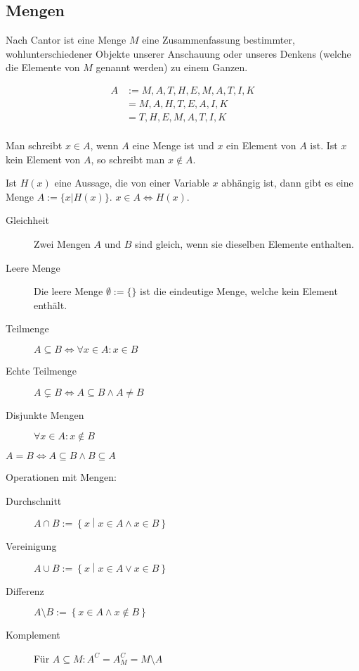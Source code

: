 \subsection{Mengen}
Nach Cantor ist eine Menge $M$ eine Zusammenfassung bestimmter, wohlunterschiedener Objekte unserer Anschauung oder unseres Denkens (welche die Elemente von $M$ genannt werden) zu einem Ganzen.

\begin{example}
  \begin{align*}
    A &:= {M, A, T, H, E, M, A, T, I, K} \\
    \, &= {M, A, H, T, E, A, I, K} \\
    \, &= {T, H, E, M, A, T, I, K} \\
  \end{align*}
\end{example}

Man schreibt $x \in A$, wenn $A$ eine Menge ist und $x$ ein Element von $A$ ist. Ist $x$ kein Element von $A$, so schreibt man $x \not\in A$.

Ist $H(x)$ eine Aussage, die von einer Variable $x$ abhängig ist, dann gibt es eine Menge $A := \{x|H(x)\}$. $x \in A \iff H(x)$.

\begin{definition}
  \begin{description}
  \item[Gleichheit] Zwei Mengen $A$ und $B$ sind gleich, wenn sie dieselben Elemente enthalten.
  \item[Leere Menge] Die leere Menge $\emptyset := \{\}$ ist die eindeutige Menge, welche kein Element enthält.
  \item[Teilmenge] $A \subseteq B \iff \forall x \in A: x \in B$
  \item[Echte Teilmenge] $A \subsetneq B \iff A \subseteq B \wedge A \ne B$
  \item[Disjunkte Mengen] $\forall x \in A: x \not\in B$
  \end{description}
\end{definition}
\begin{remark}
  $A = B \iff A \subseteq B \wedge B \subseteq A$
\end{remark}

\begin{definition}
  Operationen mit Mengen:
  \begin{description}
  \item[Durchschnitt] $A \cap B := \left\{ x \middle| x \in A \wedge x \in B \right\}$
  \item[Vereinigung] $A \cup B := \left\{ x \middle| x \in A \vee x \in B \right\}$
  \item[Differenz] $A \setminus B := \left\{ x \in A \wedge x \not\in B \right\}$
  \item[Komplement] Für $A \subseteq M: A^C = A^C_M = M \setminus A$
  \end{description}
\end{definition}